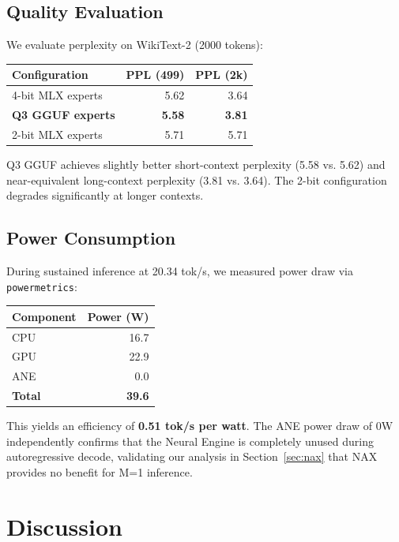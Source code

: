 \documentclass[11pt,twocolumn]{article}
\begin{document}
\subsection{Quality Evaluation}

We evaluate perplexity on WikiText-2 (2000 tokens):

\begin{center}
\small
\begin{tabular}{lrr}
\toprule
\textbf{Configuration} & \textbf{PPL (499)} & \textbf{PPL (2k)} \\
\midrule
4-bit MLX experts & 5.62 & 3.64 \\
\textbf{Q3 GGUF experts} & \textbf{5.58} & \textbf{3.81} \\
2-bit MLX experts & 5.71 & 5.71 \\
\bottomrule
\end{tabular}
\end{center}

Q3 GGUF achieves slightly better short-context perplexity (5.58 vs. 5.62) and near-equivalent long-context perplexity (3.81 vs. 3.64). The 2-bit configuration degrades significantly at longer contexts.

\subsection{Power Consumption}

During sustained inference at 20.34 tok/s, we measured power draw via \texttt{powermetrics}:

\begin{center}
\small
\begin{tabular}{lr}
\toprule
\textbf{Component} & \textbf{Power (W)} \\
\midrule
CPU & 16.7 \\
GPU & 22.9 \\
ANE & 0.0 \\
\midrule
\textbf{Total} & \textbf{39.6} \\
\bottomrule
\end{tabular}
\end{center}

This yields an efficiency of \textbf{0.51 tok/s per watt}. The ANE power draw of 0W independently confirms that the Neural Engine is completely unused during autoregressive decode, validating our analysis in Section~\ref{sec:nax} that NAX provides no benefit for M=1 inference.

\section{Discussion}
\end{document}
